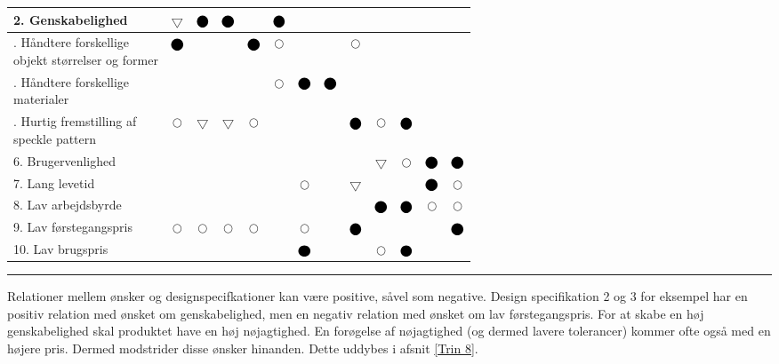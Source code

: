 \begin{table}[H]
\begin{tabular}{|p{}|c|c|c|c|c|c|c|c|c|c|c|c|}
    \hline
    \cellcolor{lightgray!20} 2. Genskabelighed & $\bigtriangledown$& $\blackbigcirc$ & $\blackbigcirc$ & & $\blackbigcirc$& & & & & &&\\
    \hline
    \cellcolor{lightgray!20} \makecell[l]{\addlinespace[0pt] 3. Håndtere forskellige \\ \quad objekt størrelser og former} \vspace{-10pt}  & $\blackbigcirc$& & & $\blackbigcirc$ &$\bigcirc$& & &$\bigcirc$& & & &\\
    \hline
    \cellcolor{lightgray!20} \makecell[l]{\addlinespace[0pt] 4. Håndtere forskellige \\ \quad materialer} \vspace{0pt} & & & & & $\bigcirc$ & $\blackbigcirc$& $\blackbigcirc$ & & & & & \\
    \hline
    \cellcolor{lightgray!20} \makecell[l]{\addlinespace[0pt]  5. Hurtig fremstilling af \\ \quad speckle pattern} \vspace{0pt} & $\bigcirc$& $\bigtriangledown$&$\bigtriangledown$& $\bigcirc$ & & &  & $\blackbigcirc$ & $\bigcirc$ & $\blackbigcirc$& & \\
    \hline
    \cellcolor{lightgray!20} 6. Brugervenlighed && & & & & & & & $\bigtriangledown$& $\bigcirc$ & $\blackbigcirc$ & $\blackbigcirc$ \\
    \hline
    \cellcolor{lightgray!20} 7. Lang levetid & & & & & & $\bigcirc$ & & $\bigtriangledown$& & &$\blackbigcirc$& $\bigcirc$ \\
    \hline
    \cellcolor{lightgray!20} 8. Lav arbejdsbyrde & & & & & & & & & $\blackbigcirc$ & $\blackbigcirc$ & $\bigcirc$& $\bigcirc$\\
    \hline
    \cellcolor{lightgray!20}  9. Lav førstegangspris&$\bigcirc$& $\bigcirc$& $\bigcirc$& $\bigcirc$& &$\bigcirc$ & & $\blackbigcirc$& & & & $\blackbigcirc$ \\
    \hline
    \cellcolor{lightgray!20} 10. Lav brugspris& & & & & & $\blackbigcirc$ & & & $\bigcirc$& $\blackbigcirc$& &  \\
    \hline
\end{tabular}
\end{table} \plainbreak{-0.5}

Relationer mellem ønsker og designspecifkationer kan være positive, såvel som negative. Design specifikation 2 og 3 for eksempel har en positiv relation med ønsket om genskabelighed, men en negativ relation med ønsket om lav førstegangspris. For at skabe en høj genskabelighed skal produktet have en høj nøjagtighed. En forøgelse af nøjagtighed (og dermed lavere tolerancer) kommer ofte også med en højere pris. Dermed modstrider disse ønsker hinanden. Dette uddybes i afsnit \ref{Trin 8}.